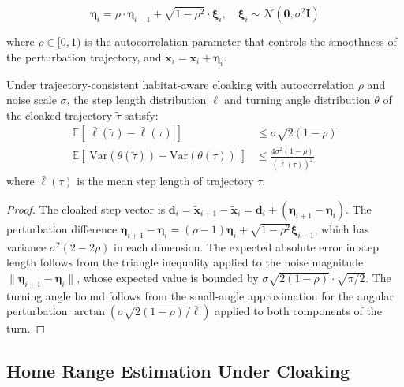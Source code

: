 \begin{equation}
\boldsymbol{\eta}_i = \rho \cdot \boldsymbol{\eta}_{i-1} + \sqrt{1 - \rho^2} \cdot \boldsymbol{\xi}_i, \quad \boldsymbol{\xi}_i \sim \mathcal{N}(\mathbf{0}, \sigma^2 \mathbf{I})
\end{equation}

where $\rho \in [0, 1)$ is the autocorrelation parameter that controls the smoothness of the perturbation trajectory, and $\tilde{\mathbf{x}}_i = \mathbf{x}_i + \boldsymbol{\eta}_i$.

\begin{theorem}
\label{thm:preservation}
Under trajectory-consistent habitat-aware cloaking with autocorrelation $\rho$ and noise scale $\sigma$, the step length distribution $\ell$ and turning angle distribution $\theta$ of the cloaked trajectory $\tilde{\tau}$ satisfy:
\begin{align}
\mathbb{E}[|\bar{\ell}(\tilde{\tau}) - \bar{\ell}(\tau)|] &\leq \sigma\sqrt{2(1-\rho)} \\
\mathbb{E}[|\text{Var}(\theta(\tilde{\tau})) - \text{Var}(\theta(\tau))|] &\leq \frac{4\sigma^2(1-\rho)}{(\bar{\ell}(\tau))^2}
\end{align}
where $\bar{\ell}(\tau)$ is the mean step length of trajectory $\tau$.
\end{theorem}

\begin{proof}
The cloaked step vector is $\tilde{\mathbf{d}}_i = \tilde{\mathbf{x}}_{i+1} - \tilde{\mathbf{x}}_i = \mathbf{d}_i + (\boldsymbol{\eta}_{i+1} - \boldsymbol{\eta}_i)$. The perturbation difference $\boldsymbol{\eta}_{i+1} - \boldsymbol{\eta}_i = (\rho - 1)\boldsymbol{\eta}_i + \sqrt{1-\rho^2}\boldsymbol{\xi}_{i+1}$, which has variance $\sigma^2(2 - 2\rho)$ in each dimension. The expected absolute error in step length follows from the triangle inequality applied to the noise magnitude $\|\boldsymbol{\eta}_{i+1} - \boldsymbol{\eta}_i\|$, whose expected value is bounded by $\sigma\sqrt{2(1-\rho)} \cdot \sqrt{\pi/2}$. The turning angle bound follows from the small-angle approximation for the angular perturbation $\arctan(\sigma\sqrt{2(1-\rho)}/\bar{\ell})$ applied to both components of the turn.
\end{proof}

\subsection{Home Range Estimation Under Cloaking}

